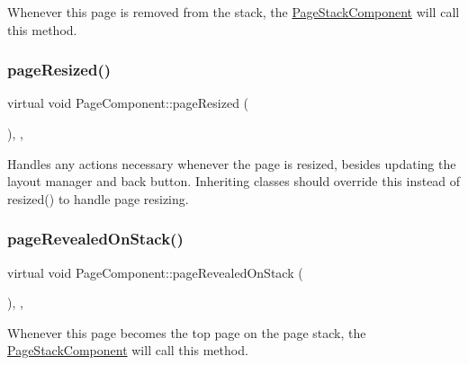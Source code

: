 Whenever this page is removed from the stack, the \mbox{\hyperlink{classPageStackComponent}{Page\+Stack\+Component}} will call this method. \mbox{\label{classPageComponent_a9f1abe0866fdc56ed3bc69706027976a}} 
\subsubsection{\texorpdfstring{page\+Resized()}{pageResized()}}
{\footnotesize\ttfamily virtual void Page\+Component\+::page\+Resized (\begin{DoxyParamCaption}{ }\end{DoxyParamCaption})\hspace{0.3cm}{\ttfamily [inline]}, {\ttfamily [protected]}, {\ttfamily [virtual]}}

Handles any actions necessary whenever the page is resized, besides updating the layout manager and back button. Inheriting classes should override this instead of resized() to handle page resizing. \mbox{\label{classPageComponent_adf0158301585f91e9bad647adc6ed86c}} 
\subsubsection{\texorpdfstring{page\+Revealed\+On\+Stack()}{pageRevealedOnStack()}}
{\footnotesize\ttfamily virtual void Page\+Component\+::page\+Revealed\+On\+Stack (\begin{DoxyParamCaption}{ }\end{DoxyParamCaption})\hspace{0.3cm}{\ttfamily [inline]}, {\ttfamily [protected]}, {\ttfamily [virtual]}}

Whenever this page becomes the top page on the page stack, the \mbox{\hyperlink{classPageStackComponent}{Page\+Stack\+Component}} will call this method. \mbox{\label{classPageComponent_a92c6528f2296b6ab1b2e3420aa75a198}} 

